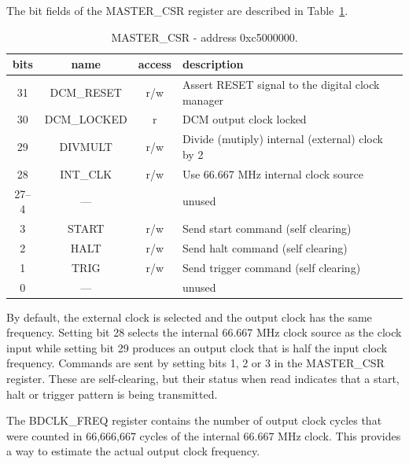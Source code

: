 \documentclass[11pt]{article}
\begin{document}
The bit fields of the MASTER\_CSR register are described in
Table~\ref{tab-mastercsr}.
\begin{table}
\begin{center}
\small
\begin{tabular}{|c|c|c|l|} \hline
bits & name & access & description \\ \hline\hline
31 & DCM\_RESET & r/w & Assert RESET signal to the digital clock manager \\
30 & DCM\_LOCKED & r & DCM output clock locked \\
29 & DIVMULT & r/w & Divide (mutiply) internal (external) clock by 2 \\
28 & INT\_CLK & r/w & Use 66.667 MHz internal clock source \\
27--4 &  --- &  & unused \\
3 & START & r/w & Send start command (self clearing) \\
2 & HALT & r/w & Send halt command (self clearing) \\
1 & TRIG & r/w & Send trigger command (self clearing) \\
0 & --- &     & unused \\ \hline
\end{tabular}
\end{center}
\caption{\label{tab-mastercsr}MASTER\_CSR - address 0xc5000000.}
\end{table}
By default, the external clock is selected and the output clock has the
same frequency.  Setting bit 28 selects the internal 66.667 MHz clock
source as the clock input while setting bit 29 produces an output clock
that is half the input clock frequency.  Commands are sent by setting
bits 1, 2 or 3 in the MASTER\_CSR register.  These are self-clearing, but
their status when read indicates that a start, halt or trigger pattern is
being transmitted.

The BDCLK\_FREQ register contains the number of output clock
cycles that were counted in 66,666,667 cycles of the internal 66.667 MHz
clock.  This provides a way to estimate the actual output clock frequency.
\end{document}
